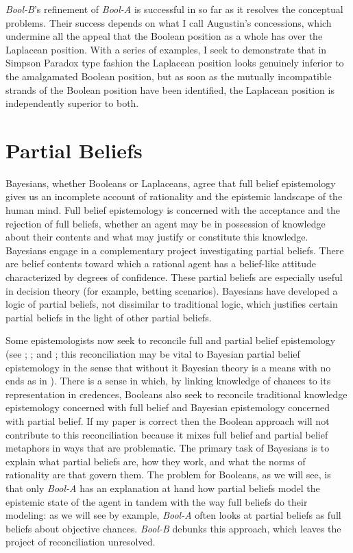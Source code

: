 \documentclass[11pt]{article}
\newcommand{\anderson}[0]{\textit{Bool-A}}
\newcommand{\augustin}[0]{\textit{Bool-B}}
\begin{document}
{\augustin}'s refinement of {\anderson} is successful in so far as it
resolves the conceptual problems. Their success depends on what I call
Augustin's concessions, which undermine all the appeal that the
Boolean position as a whole has over the Laplacean position. With a
series of examples, I seek to demonstrate that in Simpson Paradox type
fashion the Laplacean position looks genuinely inferior to the
amalgamated Boolean position, but as soon as the mutually incompatible
strands of the Boolean position have been identified, the Laplacean
position is independently superior to both.

\section{Partial Beliefs}
\label{amalgamated}

Bayesians, whether Booleans or Laplaceans, agree that full belief
epistemology gives us an incomplete account of rationality and the
epistemic landscape of the human mind. Full belief epistemology is
concerned with the acceptance and the rejection of full beliefs,
whether an agent may be in possession of knowledge about their
contents and what may justify or constitute this knowledge. Bayesians
engage in a complementary project investigating partial beliefs. There
are belief contents toward which a rational agent has a belief-like
attitude characterized by degrees of confidence. These partial beliefs
are especially useful in decision theory (for example, betting
scenarios). Bayesians have developed a logic of partial beliefs, not
dissimilar to traditional logic, which justifies certain partial
beliefs in the light of other partial beliefs.

Some epistemologists now seek to reconcile full and partial belief
epistemology (see ; ; and
; this reconciliation may be vital to Bayesian
partial belief epistemology in the sense that without it Bayesian
theory is a means with no ends as in ).
There is a sense in which, by linking knowledge of chances to its
representation in credences, Booleans also seek to reconcile
traditional knowledge epistemology concerned with full belief and
Bayesian epistemology concerned with partial belief. If my paper is
correct then the Boolean approach will not contribute to this
reconciliation because it mixes full belief and partial belief
metaphors in ways that are problematic. The
primary task of Bayesians is to explain what partial beliefs are, how
they work, and what the norms of rationality are that govern them. The
problem for Booleans, as we will see, is that only {\anderson} has an
explanation at hand how partial beliefs model the epistemic state of
the agent
in tandem with the way full beliefs do their modeling: as we will see
by example, {\anderson} often looks at partial beliefs as full beliefs
about objective chances. {\augustin} debunks this approach, which
leaves the project of reconciliation unresolved.
\end{document}
